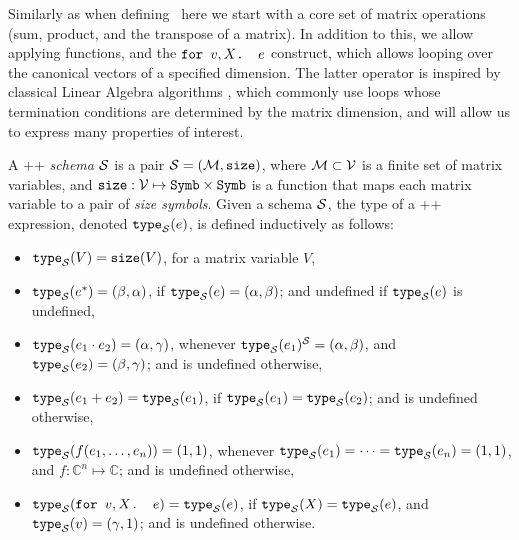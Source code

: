 \medskip

Similarly as when defining \lang\, here we start with a core set of matrix operations (sum, product, and the transpose of a matrix). In addition to this, we allow applying functions, and  the $\texttt{for }v,X \texttt{. }e$ construct, which allows looping over the canonical vectors of a specified dimension. The latter operator is inspired by classical Linear Algebra algorithms \cite{num}, which commonly use loops whose termination conditions are determined by the matrix dimension, and will allow us to express many properties of interest.

A \lang++ {\em schema} $\mathcal{S}$ is a pair $\mathcal{S}=(\mathcal{M},\texttt{size})$, where $\mathcal{M}\subset \mathcal{V}$ is a finite set of matrix variables, and $\texttt{size}: \mathcal{V} \mapsto \texttt{Symb}\times \texttt{Symb}$ is a function that maps each matrix variable to a pair of {\em size symbols}. Given a schema $\mathcal{S}$, the type of a \lang++ expression, denoted $\texttt{type}_{\mathcal{S}}(e)$, is defined inductively as follows:
\begin{itemize}
\item $\texttt{type}_{\mathcal{S}}(V) = \texttt{size}(V)$, for a matrix variable $V$,
\item $\texttt{type}_{\mathcal{S}}(e^*) = (\beta,\alpha)$, if $\texttt{type}_{\mathcal{S}}(e)=(\alpha,\beta)$; and undefined if $\texttt{type}_{\mathcal{S}}(e)$ is undefined,
\item $\texttt{type}_{\mathcal{S}}(e_1 \cdot e_2) = (\alpha,\gamma)$, whenever $\texttt{type}_{\mathcal{S}}(e_1)^{\mathcal{S}}=(\alpha,\beta)$, and $\texttt{type}_{\mathcal{S}}(e_2)=(\beta,\gamma)$; and is undefined otherwise,
\item $\texttt{type}_{\mathcal{S}}(e_1 + e_2) = \texttt{type}_{\mathcal{S}}(e_1)$, if $\texttt{type}_{\mathcal{S}}(e_1) = \texttt{type}_{\mathcal{S}}(e_2)$; and is undefined otherwise,
\item $\texttt{type}_{\mathcal{S}}(f(e_1,\ldots ,e_n)) = (1,1)$, whenever $\texttt{type}_{\mathcal{S}}(e_1)= \cdots =\texttt{type}_{\mathcal{S}}(e_n)=(1,1)$, and $f:\mathbb{C}^n\mapsto \mathbb{C}$; and is undefined otherwise,
\item $\texttt{type}_{\mathcal{S}}(\texttt{for }v,X \texttt{. }e) = \texttt{type}_{\mathcal{S}}(e)$, if $\texttt{type}_{\mathcal{S}}(X) = \texttt{type}_{\mathcal{S}}(e)$, and $\texttt{type}_{\mathcal{S}}(v) = (\gamma,1)$; and is undefined otherwise.
\end{itemize}

